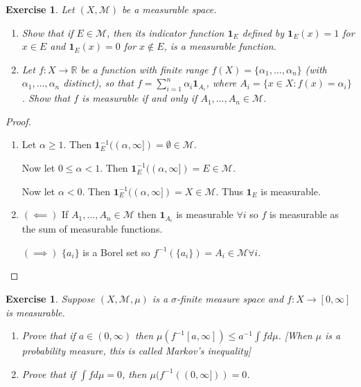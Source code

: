 \documentclass{article}
\newtheorem{exercise}[theorem]{Exercise}
\begin{document}
\begin{exercise}
Let \((X, \mathcal{M})\) be a measurable space.
\begin{enumerate}   
\item[(a)] Show that if \( E \in \mathcal{M} \), then its indicator function \( \mathbf{1}_E \) defined by \( \mathbf{1}_E(x) = 1 \) for \( x \in E \) and \( \mathbf{1}_E(x) = 0 \) for \( x \notin E \), is a measurable function.
    
\item[(b)] Let \( f : X \to \mathbb{R} \) be a function with finite range \( f(X) = \{\alpha_1, \dots, \alpha_n\} \) (with \( \alpha_1, \dots, \alpha_n \) distinct), so that \( f = \sum_{i=1}^{n} \alpha_i \mathbf{1}_{A_i} \), where \( A_i = \{ x \in X : f(x) = \alpha_i \} \). Show that \( f \) is measurable if and only if \( A_1, \dots, A_n \in \mathcal{M} \).
\end{enumerate}
\end{exercise}
\begin{proof}
\begin{enumerate}
    \item[(a)] Let $\alpha\geq 1$. Then $\mathbf{1}_E^{-1}((\alpha,\infty])=\emptyset\in\mathcal{M}$.

    Now let $0\leq\alpha<1$. Then $\mathbf{1}_E^{-1}((\alpha,\infty])=E\in\mathcal{M}$.

    Now let $\alpha<0$. Then $\mathbf{1}_E^{-1}((\alpha,\infty])=X\in\mathcal{M}$. Thus $\mathbf{1}_E$ is measurable.
    \item[(b)] $(\impliedby)$ If $A_1,...,A_n\in\mathcal{M}$ then $\mathbf{1}_{A_i}$ is measurable $\forall i$ so $f$ is measurable as the sum of measurable functions.

    $(\implies)$ $\{a_i\}$ is a Borel set so $f^{-1}(\{a_i\})=A_i\in\mathcal{M}\forall i$.
\end{enumerate}
\end{proof}
\begin{exercise}
Suppose \((X, \mathcal{M}, \mu)\) is a \(\sigma\)-finite measure space and \( f : X \to [0, \infty] \) is measurable.
\begin{enumerate}   
\item[(a)] Prove that if \( a \in (0, \infty) \) then \( \mu(f^{-1}[a, \infty]) \leq a^{-1} \int f d\mu \). [When \( \mu \) is a probability measure, this is called \textit{Markov's inequality}]
    
\item[(b)] Prove that if \( \int f d\mu = 0 \), then \( \mu(f^{-1}((0, \infty])) = 0 \).
\end{enumerate}
\end{exercise}
\end{document}
